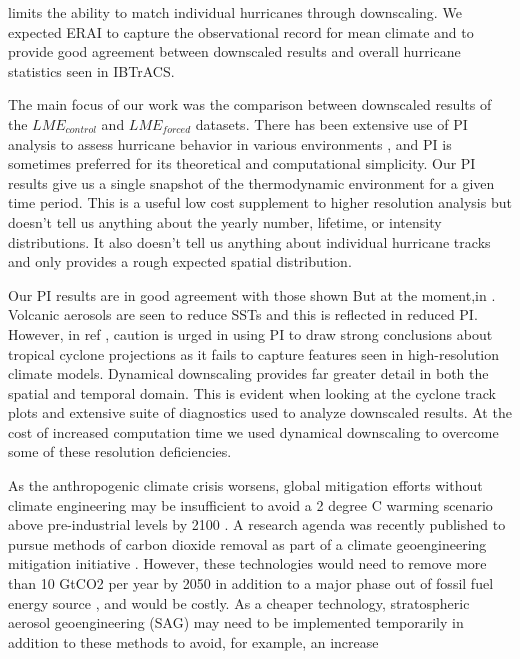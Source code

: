 \documentclass[phd,tocprelim]{cornell}
\begin{document}
limits the ability to match individual hurricanes through downscaling. 
We expected ERAI to capture the observational record for mean climate 
and to provide good agreement between downscaled results and overall hurricane
statistics seen in IBTrACS.
\par
The main focus of our work was the comparison between downscaled results of the
$LME_{control}$ and $LME_{forced}$ datasets. There has been extensive use of 
PI analysis to assess hurricane behavior in various environments 
\cite{yan2018divergent,ting2015,Kossin2009,vecchi2007effect}, and PI is 
sometimes preferred for its theoretical and computational simplicity. Our 
PI results give us a single snapshot of the thermodynamic environment for 
a given time period. This is a useful low cost supplement to higher 
resolution analysis but doesn't tell us anything about the yearly number, 
lifetime, or intensity distributions. It also doesn't tell us anything 
about individual hurricane tracks and only provides a rough expected 
spatial distribution. 
\par
Our PI results are in good agreement with those shown 
But at the moment,in \cite{yan2018divergent,vecchi2007effect}. Volcanic aerosols are 
seen to reduce SSTs and this is reflected
in reduced PI. However, in ref \cite{wehner2015}, caution is urged in using PI 
to draw strong conclusions about tropical cyclone projections as it fails to 
capture features seen in high-resolution climate models. Dynamical 
downscaling provides far greater detail in both the spatial and temporal domain. 
This is evident when looking at the cyclone track plots and extensive suite of 
diagnostics used to analyze downscaled results. At the cost of increased 
computation time we used dynamical downscaling to overcome some of these 
resolution deficiencies. 
\par
As the anthropogenic climate crisis worsens, global mitigation efforts 
without climate engineering may be insufficient to avoid a 2 degree C 
warming scenario above pre-industrial levels by 2100 
\cite{intergovernmental2018global}. A research agenda was recently 
published to pursue methods of carbon dioxide removal as part of a climate 
geoengineering mitigation initiative \cite{national2018negative}.  However, 
these technologies would need to remove more than 10 GtCO2 per year by 2050 
in addition to a major phase out of fossil fuel energy source 
\cite{united2017emissions}, and would be costly. As a cheaper technology, 
stratospheric aerosol geoengineering (SAG) may need to be implemented 
temporarily in addition to these methods to avoid, for example, an increase 
\end{document}
